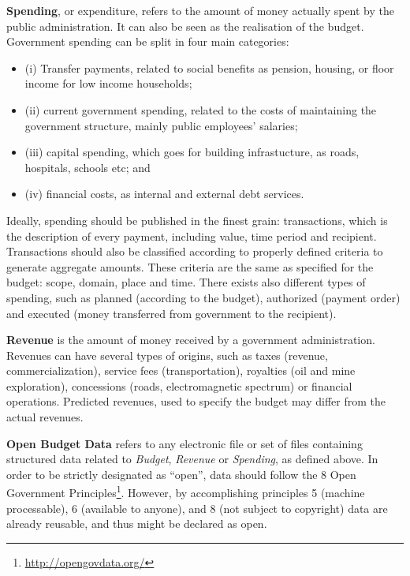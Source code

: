 \hspace{.8cm}
\begin{defn}
\textbf{Spending}, or expenditure, refers to the amount of money actually spent by the public administration.
It can also be seen as the realisation of the budget.
Government spending can be split in four main categories: 
\begin{itemize}
	\item (i) Transfer payments, related to social benefits as pension, housing, or floor income for low income households; 
	\item (ii) current government spending, related to the costs of maintaining the government structure, mainly public employees' salaries;
	\item (iii) capital spending, which goes for building infrastucture, as roads, hospitals, schools etc; and
	\item (iv) financial costs, as internal and external debt services.
\end{itemize}
\end{defn}

Ideally, spending should be published in the finest grain: transactions, which is the description of every payment, including value, time period and recipient. 
Transactions should also be classified according to properly defined criteria to generate aggregate amounts. 
These criteria are the same as specified for the budget: scope, domain, place and time.
There exists also different types of spending, such as planned (according to the budget), authorized (payment order) and executed (money transferred from government to the recipient).

\hspace{.8cm}
\begin{defn}
\textbf{Revenue} is the amount of money received by a government administration. 
Revenues can have several types of origins, such as taxes (revenue, commercialization), service fees (transportation), royalties (oil and mine exploration), concessions (roads, electromagnetic spectrum) or financial operations. 
Predicted revenues, used to specify the budget may differ from the actual revenues.
\end{defn}

\hspace{.8cm}
\begin{defn}
\textbf{Open Budget Data} refers to any electronic file or set of files containing structured data related to \emph{Budget}, \emph{Revenue} or \emph{Spending}, as defined above.
In order to be strictly designated as ``open'', data should follow the 8 Open Government Principles\footnote{\url{http://opengovdata.org/}}.
However, by accomplishing principles 5 (machine processable), 6 (available to anyone), and 8 (not subject to copyright) data are already reusable, and thus might be declared as open.

\end{defn}

